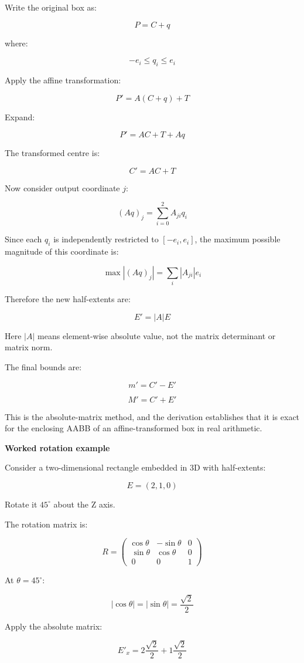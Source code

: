Write the original box as:

\[
P=C+q
\]

where:

\[
-e_i\le q_i\le e_i
\]

Apply the affine transformation:

\[
P'=A(C+q)+T
\]

Expand:

\[
P'=AC+T+Aq
\]

The transformed centre is:

\[
\boxed{C'=AC+T}
\]

Now consider output coordinate \(j\):

\[
(Aq)_j=\sum_{i=0}^{2}A_{ji}q_i
\]

Since each \(q_i\) is independently restricted to \([-e_i,e_i]\), the maximum possible magnitude of this coordinate is:

\[
\max |(Aq)_j| = \sum_i|A_{ji}|e_i
\]

Therefore the new half-extents are:

\[
\boxed{ E'=|A|E }
\]

Here \(|A|\) means element-wise absolute value, not the matrix determinant or matrix norm.

The final bounds are:

\[
\boxed{ m'=C'-E' }
\]

\[
\boxed{ M'=C'+E' }
\]

This is the absolute-matrix method, and the derivation establishes that it is exact for the enclosing AABB of an affine-transformed box in real arithmetic.

\textbf{Worked rotation example}

Consider a two-dimensional rectangle embedded in 3D with half-extents:

\[
E=(2,1,0)
\]

Rotate it \(45^\circ\) about the Z axis.

The rotation matrix is:

\[
R= \begin{pmatrix} \cos\theta&-\sin\theta&0\\\ \sin\theta&\cos\theta&0\\\ 0&0&1 \end{pmatrix}
\]

At \(\theta=45^\circ\):

\[
|\cos\theta|=|\sin\theta|=\frac{\sqrt2}{2}
\]

Apply the absolute matrix:

\[
E'_x=2\frac{\sqrt2}{2}+1\frac{\sqrt2}{2}
\]


